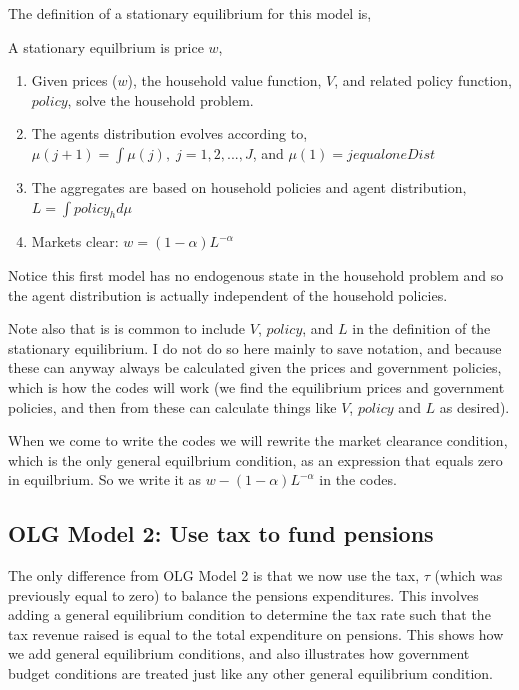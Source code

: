 The definition of a stationary equilibrium for this model is,
\begin{definition}
 A stationary equilbrium is price $w$,
 \begin{enumerate}
  \item Given prices ($w$), the household value function, $V$, and related policy function, $policy$, solve the household problem.
  \item The agents distribution evolves according to,
   \\  $\mu(j+1)=\int \mu(j), \; j=1,2,...,J$, and $\mu(1)=jequaloneDist$
  \item The aggregates are based on household policies and agent distribution,
   \\  $L=\int policy_h d\mu$
  \item Markets clear: $w=(1-\alpha)L^{-\alpha}$
 \end{enumerate}
\end{definition}
Notice this first model has no endogenous state in the household problem and so the agent distribution is actually independent of the household policies.

Note also that is is common to include $V$, $policy$, and $L$ in the definition of the stationary equilibrium. I do not do so here mainly to save notation, and because these can anyway always be calculated given the prices and government policies, which is how the codes will work (we find the equilibrium prices and government policies, and then from these can calculate things like $V$, $policy$ and $L$ as desired).

When we come to write the codes we will rewrite the market clearance condition, which is the only general equilbrium condition, as an expression that equals zero in equilbrium. So we write it as $w-(1-\alpha)L^{-\alpha}$ in the codes.

\subsection{OLG Model 2: Use tax to fund pensions}
The only difference from OLG Model 2 is that we now use the tax, $\tau$ (which was previously equal to zero) to balance the pensions expenditures. This involves adding a general equilibrium condition to determine the tax rate such that the tax revenue raised is equal to the total expenditure on pensions. This shows how we add general equilibrium conditions, and also illustrates how government budget conditions are treated just like any other general equilibrium condition.

